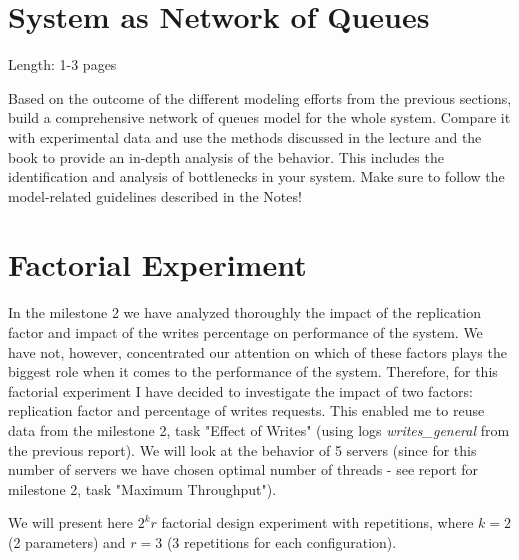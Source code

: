 \documentclass[11pt]{article}
\begin{document}
\clearpage

\section{System as Network of Queues}\label{sec:network-of-queues}

Length: 1-3 pages

Based on the outcome of the different modeling efforts from the previous sections, build a comprehensive network of queues model for the whole system. Compare it with experimental data and use the methods discussed in the lecture and the book to provide an in-depth analysis of the behavior. This includes the identification and analysis of bottlenecks in your system. Make sure to follow the model-related guidelines described in the Notes!

\clearpage

\section{Factorial Experiment}\label{sec:2k-experiment}

\iffalse
Length: 1-3 pages

Design a $2^k$ factorial experiment and follow the best practices outlined in the book and in the lecture to analyze the results. You are free to choose the parameters for the experiment and in case you have already collected data in the second milestone that can be used as source for this experiment, you can reuse it. Otherwise, in case you need to run new experiments anyway, we recommend exploring the impact of request size on the middleware together with an other parameter.
\fi

In the milestone 2 we have analyzed thoroughly the impact of the replication factor and impact of the writes percentage on performance of the system. We have not, however, concentrated our attention on which of these factors plays the biggest role when it comes to the performance of the system. Therefore, for this factorial experiment I have decided to investigate the impact of two factors: replication factor and percentage of writes requests. This enabled me to reuse data from the milestone 2, task "Effect of Writes" (using logs {\it writes\_general} from the previous report). We will look at the behavior of 5 servers (since for this number of servers we have chosen optimal number of threads - see report for milestone 2, task "Maximum Throughput").

We will present here $2^kr$ factorial design experiment with repetitions, where $k = 2$ (2 parameters) and $r = 3$ (3 repetitions for each configuration).
\end{document}
